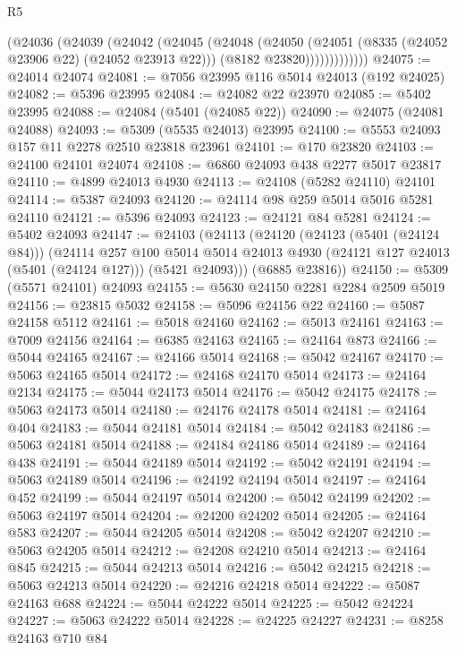 \begin{lexlean}{R5}
\begin{coremodule}
                (@24036
                  (@24039
                    (@24042
                      (@24045
                        (@24048
                          (@24050
                            (@24051 (@8335 (@24052 @23906 @22) (@24052 @23913 @22)))
                            (@8182 @23820)))))))))))))
@24075 := @24014 @24074
@24081 := @7056 @23995 @116 @5014 @24013 (@192 @24025)
@24082 := @5396 @23995
@24084 := @24082 @22 @23970
@24085 := @5402 @23995
@24088 := @24084 (@5401 (@24085 @22))
@24090 := @24075 (@24081 @24088)
@24093 := @5309 (@5535 @24013) @23995
@24100 := @5553 @24093 @157 @11 @2278 @2510 @23818 @23961
@24101 := @170 @23820
@24103 := @24100 @24101 @24074
@24108 := @6860 @24093 @438 @2277 @5017 @23817
@24110 := @4899 @24013 @4930
@24113 := @24108 (@5282 @24110) @24101
@24114 := @5387 @24093
@24120 := @24114 @98 @259 @5014 @5016 @5281 @24110
@24121 := @5396 @24093
@24123 := @24121 @84 @5281
@24124 := @5402 @24093
@24147 := @24103
    (@24113
      (@24120
        (@24123 (@5401 (@24124 @84)))
        (@24114
          @257
          @100
          @5014
          @5014
          @24013
          @4930
          (@24121 @127 @24013 (@5401 (@24124 @127)))
          (@5421 @24093)))
      (@6885 @23816))
@24150 := @5309 (@5571 @24101) @24093
@24155 := @5630 @24150 @2281 @2284 @2509 @5019
@24156 := @23815 @5032
@24158 := @5096 @24156 @22
@24160 := @5087 @24158 @5112
@24161 := @5018 @24160
@24162 := @5013 @24161
@24163 := @7009 @24156
@24164 := @6385 @24163
@24165 := @24164 @873
@24166 := @5044 @24165
@24167 := @24166 @5014
@24168 := @5042 @24167
@24170 := @5063 @24165 @5014
@24172 := @24168 @24170 @5014
@24173 := @24164 @2134
@24175 := @5044 @24173 @5014
@24176 := @5042 @24175
@24178 := @5063 @24173 @5014
@24180 := @24176 @24178 @5014
@24181 := @24164 @404
@24183 := @5044 @24181 @5014
@24184 := @5042 @24183
@24186 := @5063 @24181 @5014
@24188 := @24184 @24186 @5014
@24189 := @24164 @438
@24191 := @5044 @24189 @5014
@24192 := @5042 @24191
@24194 := @5063 @24189 @5014
@24196 := @24192 @24194 @5014
@24197 := @24164 @452
@24199 := @5044 @24197 @5014
@24200 := @5042 @24199
@24202 := @5063 @24197 @5014
@24204 := @24200 @24202 @5014
@24205 := @24164 @583
@24207 := @5044 @24205 @5014
@24208 := @5042 @24207
@24210 := @5063 @24205 @5014
@24212 := @24208 @24210 @5014
@24213 := @24164 @845
@24215 := @5044 @24213 @5014
@24216 := @5042 @24215
@24218 := @5063 @24213 @5014
@24220 := @24216 @24218 @5014
@24222 := @5087 @24163 @688
@24224 := @5044 @24222 @5014
@24225 := @5042 @24224
@24227 := @5063 @24222 @5014
@24228 := @24225 @24227
@24231 := @8258 @24163 @710 @84

\end{coremodule}
\end{lexlean}
